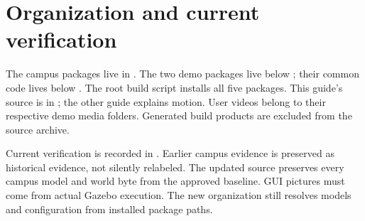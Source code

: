 \section{Organization and current verification}
The campus packages live in . The two demo packages live below ; their common code lives below . The root build script installs all five packages. This guide's source is in ; the other guide explains motion. User videos belong to their respective demo media folders. Generated build products are excluded from the source archive.

Current verification is recorded in . Earlier campus evidence is preserved as historical evidence, not silently relabeled. The updated source preserves every campus model and world byte from the approved baseline. GUI pictures must come from actual Gazebo execution. The new organization still resolves models and configuration from installed package paths.
